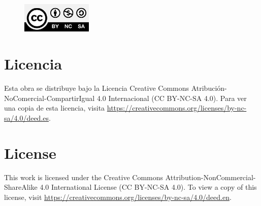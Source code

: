 \newpage

\begin{figure}[ht]
    \centering
    \includegraphics[width=0.3\textwidth]{./images/CC-BY-NC-SA-4.0.jpg}
\end{figure}

\section*{Licencia}

Esta obra se distribuye bajo la Licencia Creative Commons Atribución-NoComercial-CompartirIgual 4.0 Internacional (CC BY-NC-SA 4.0). Para ver una copia de esta licencia, visita \url{https://creativecommons.org/licenses/by-nc-sa/4.0/deed.es}.

\section*{License}

This work is licensed under the Creative Commons Attribution-NonCommercial-ShareAlike 4.0 International License (CC BY-NC-SA 4.0). To view a copy of this license, visit \url{https://creativecommons.org/licenses/by-nc-sa/4.0/deed.en}.

\newpage
